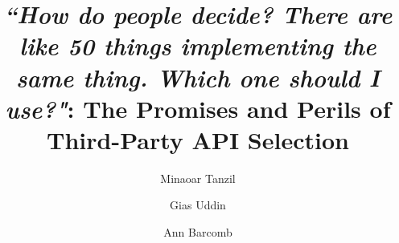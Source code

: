 \documentclass[manuscript,review,screen, table]{acmart}
\begin{document}
\title[The Promises and Perils of Third-Party API Selection]{\textit{``How do people decide? There are like 50 things implementing the same thing. Which one should I use?"}: The Promises and Perils of Third-Party API Selection}





\author{Minaoar Tanzil}
\author{Gias Uddin}
\author{Ann Barcomb}


\renewcommand{\shortauthors}{Tanzil et al.}
\end{document}
